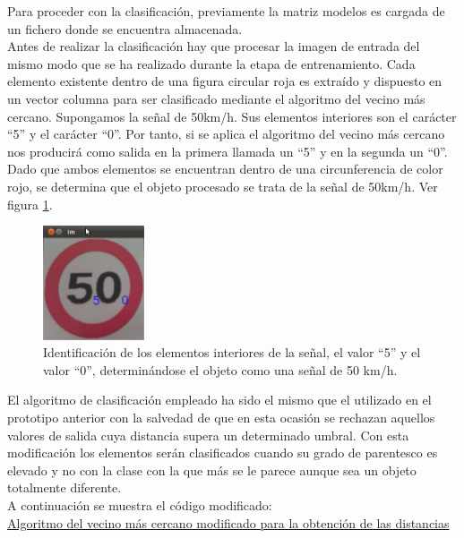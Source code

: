 Para proceder con la clasificación, previamente la matriz modelos es cargada de un fichero donde se encuentra almacenada.\\

Antes de realizar la clasificación hay que procesar la imagen de entrada del mismo modo que se ha realizado durante la etapa de entrenamiento. Cada elemento existente dentro de una figura circular roja es extraído y dispuesto en un vector columna para ser clasificado mediante el algoritmo del vecino más cercano. Supongamos la señal de 50km/h. Sus elementos interiores son el carácter ``5'' y el carácter ``0''. Por tanto, si se aplica el algoritmo del vecino más cercano nos producirá como salida en la primera llamada un ``5'' y en la segunda un ``0''. Dado que ambos elementos se encuentran dentro de una circunferencia de color rojo, se determina que el objeto procesado se trata de la señal de 50km/h. Ver figura \ref{fig:salida-protot3}. \\

\begin{figure}[H]
  \begin{center}
        \includegraphics[width=3cm]{./imagenes/prototipo3/salida3.png}
  \end{center}
    \caption{Identificación de los elementos interiores de la señal, el valor ``5'' y el valor ``0'', determinándose el objeto como una señal de 50 km/h.}
    \label{fig:salida-protot3}
\end{figure}

El algoritmo de clasificación empleado ha sido el mismo que el utilizado en el prototipo anterior con la salvedad de que en esta ocasión se rechazan aquellos valores de salida cuya distancia supera un determinado umbral. Con esta modificación los elementos serán clasificados cuando su grado de parentesco es elevado y no con la clase con la que más se le parece aunque sea un objeto totalmente diferente.\\

A continuación se muestra el código modificado:\\

\underline{Algoritmo del vecino más cercano modificado para la obtención de las distancias}\\



